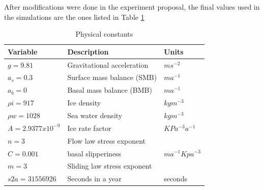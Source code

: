 \documentclass{article}
\begin{document}
After modifications were done in the experiment proposal, the final values used in the simulations are the ones listed in Table \ref{Physical constants}
\begin{table}[!h]
	\begin{center}
		\caption{Physical constants}
		\label{Physical constants}
		\begin{tabular}{|l|l|l|}
			\hline
			Variable          & Description                 & Units           \\ \hline
			$g=9.81$         & Gravitational acceleration  & $ms^{-2}$         \\ \hline
			$a_s=0.3$       & Surface mass balance (SMB)  & $ma^{-1}$         \\ \hline
			$a_b=0$             & Basal mass balance (BMB)    & $ma^{-1}$         \\ \hline
			$\rho i=917$        & Ice density                 & $kg m^{-3}$       \\ \hline
			$\rho w=1028$      & Sea water density           & $kg m^{-3}$       \\ \hline
			$A= 2.9377x10^{-9}$ & Ice rate factor             & $KPa^{-3}a^{-1}$  \\ \hline
			$n=3$               & Flow law stress exponent    &                 \\ \hline
			$C=0.001$           & basal slipperiness          & $ma^{-1}Kpa^{-3}$ \\ \hline
			$m=3$               & Sliding law stress exponent &                 \\ \hline
			$s2a=31556926$     & Seconds in a year           & seconds         \\ \hline
		\end{tabular}
	\end{center}
\end{table}
\end{document}
